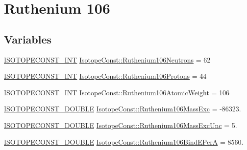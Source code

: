 \hypertarget{group___isotope_const-_ruthenium-_ru106}{}\section{Ruthenium 106}
\label{group___isotope_const-_ruthenium-_ru106}
\subsection*{Variables}
\begin{DoxyCompactItemize}
\item 
\mbox{\hyperlink{group___isotope_const-_macros_ga5f18360b3e99483a35c32d789e62621c}{I\+S\+O\+T\+O\+P\+E\+C\+O\+N\+S\+T\+\_\+\+I\+NT}} \mbox{\hyperlink{group___isotope_const-_ruthenium-_ru106_gaf02797c366b735f289b2ef483376e437}{Isotope\+Const\+::\+Ruthenium106\+Neutrons}} = 62
\item 
\mbox{\hyperlink{group___isotope_const-_macros_ga5f18360b3e99483a35c32d789e62621c}{I\+S\+O\+T\+O\+P\+E\+C\+O\+N\+S\+T\+\_\+\+I\+NT}} \mbox{\hyperlink{group___isotope_const-_ruthenium-_ru106_gac56df25f3b912bb392cbc456a7538ed9}{Isotope\+Const\+::\+Ruthenium106\+Protons}} = 44
\item 
\mbox{\hyperlink{group___isotope_const-_macros_ga5f18360b3e99483a35c32d789e62621c}{I\+S\+O\+T\+O\+P\+E\+C\+O\+N\+S\+T\+\_\+\+I\+NT}} \mbox{\hyperlink{group___isotope_const-_ruthenium-_ru106_gac8946233d897b3de73e3d80aabf1258c}{Isotope\+Const\+::\+Ruthenium106\+Atomic\+Weight}} = 106
\item 
\mbox{\hyperlink{group___isotope_const-_macros_ga8f45a7272ce02c0b4c65c44636ed719a}{I\+S\+O\+T\+O\+P\+E\+C\+O\+N\+S\+T\+\_\+\+D\+O\+U\+B\+LE}} \mbox{\hyperlink{group___isotope_const-_ruthenium-_ru106_ga529e866c4851ceada80459eb55db56cc}{Isotope\+Const\+::\+Ruthenium106\+Mass\+Exc}} = -\/86323.
\item 
\mbox{\hyperlink{group___isotope_const-_macros_ga8f45a7272ce02c0b4c65c44636ed719a}{I\+S\+O\+T\+O\+P\+E\+C\+O\+N\+S\+T\+\_\+\+D\+O\+U\+B\+LE}} \mbox{\hyperlink{group___isotope_const-_ruthenium-_ru106_gade8ff00d46cf2e417e6b43d654edf3a6}{Isotope\+Const\+::\+Ruthenium106\+Mass\+Exc\+Unc}} = 5.
\item 
\mbox{\hyperlink{group___isotope_const-_macros_ga8f45a7272ce02c0b4c65c44636ed719a}{I\+S\+O\+T\+O\+P\+E\+C\+O\+N\+S\+T\+\_\+\+D\+O\+U\+B\+LE}} \mbox{\hyperlink{group___isotope_const-_ruthenium-_ru106_gaf93e0d826428c724099148e6b020bfac}{Isotope\+Const\+::\+Ruthenium106\+Bind\+E\+PerA}} = 8560.
\item 

\end{DoxyCompactItemize}
